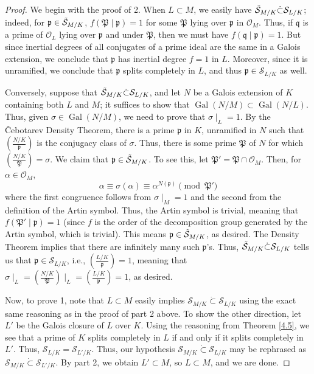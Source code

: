 \documentclass{article}
\DeclareMathOperator{\Gal}{Gal}
\theoremstyle{plain}
\theoremstyle{definition}
\theoremstyle{remark}
\numberwithin{equation}{section}
\numberwithin{thm}{section}
\begin{document}
\begin{proof}
We begin with the proof of 2. When $L \subset M$, we easily have $\Tilde{\mathcal{S}}_{M/K} \dot{\subset} \mathcal{S}_{L/K}$; indeed, for $\mathfrak{p} \in \Tilde{\mathcal{S}}_{M/K}$, $f(\mathfrak{P} \mid \mathfrak{p}) = 1$ for some $\mathfrak{P}$ lying over $\mathfrak{p}$ in $\mathcal{O}_M$. Thus, if $\mathfrak{q}$ is a prime of $\mathcal{O}_L$ lying over $\mathfrak{p}$ and under $\mathfrak{P}$, then we must have $f(\mathfrak{q} \mid \mathfrak{p}) = 1$. But since inertial degrees of all conjugates of a prime ideal are the same in a Galois extension, we conclude that $\mathfrak{p}$ has inertial degree $f = 1$ in $L$. Moreover, since it is unramified, we conclude that $\mathfrak{p}$ splits completely in $L$, and thus $\mathfrak{p} \in \mathcal{S}_{L/K}$ as well. 

Conversely, suppose that $\Tilde{\mathcal{S}}_{M/K} \dot{\subset} \mathcal{S}_{L/K}$, and let $N$ be a Galois extension of $K$ containing both $L$ and $M$; it suffices to show that $\Gal(N/M) \subset \Gal(N/L)$. Thus, given $\sigma \in \Gal(N/M)$, we need to prove that $\sigma\mid_{L} = 1$. By the Čebotarev Density Theorem, there is a prime $\mathfrak{p}$ in $K$, unramified in $N$ such that $\left(\frac{N/K}{\mathfrak{p}}\right)$ is the conjugacy class of $\sigma$. Thus, there is some prime $\mathfrak{P}$ of $N$ for which $\left(\frac{N/K}{\mathfrak{P}}\right) = \sigma$. We claim that $\mathfrak{p} \in \Tilde{\mathcal{S}}_{M/K}$. To see this, let $\mathfrak{P}' = \mathfrak{P} \cap \mathcal{O}_M$. Then, for $\alpha \in \mathcal{O}_M$, $$\alpha \equiv \sigma(\alpha) \equiv \alpha^{N(\mathfrak{p})} \pmod{\mathfrak{P}'}$$ where the first congruence follows from $\sigma\mid_{M} = 1$ and the second from the definition of the Artin symbol. Thus, the Artin symbol is trivial, meaning that $f(\mathfrak{P}' \mid \mathfrak{p}) = 1$ (since $f$ is the order of the decomposition group generated by the Artin symbol, which is trivial). This means $\mathfrak{p} \in \Tilde{\mathcal{S}}_{M/K}$, as desired. The Density Theorem implies that there are infinitely many such $\mathfrak{p}$'s. Thus, $\Tilde{\mathcal{S}}_{M/K} \dot{\subset} \mathcal{S}_{L/K}$ tells us that $\mathfrak{p} \in \mathcal{S}_{L/K}$, i.e., $\left(\frac{L/K}{\mathfrak{p}}\right) = 1$, meaning that $\sigma\mid_{L} = \left(\frac{N/K}{\mathfrak{P}}\right)\mid_{L} = \left(\frac{L/K}{\mathfrak{p}}\right) = 1$, as desired. 

Now, to prove 1, note that $L \subset M$ easily implies $\mathcal{S}_{M/K} \dot{\subset} \mathcal{S}_{L/K}$ using the exact same reasoning as in the proof of part 2 above. To show the other direction, let $L'$ be the Galois closure of $L$ over $K$. Using the reasoning from Theorem \ref{4.5}, we see that a prime of $K$ splits completely in $L$ if and only if it splits completely in $L'$. Thus, $\mathcal{S}_{L/K} = \mathcal{S}_{L'/K}$. Thus, our hypothesis $\mathcal{S}_{M/K} \dot{\subset} \mathcal{S}_{L/K}$ may be rephrased as $\mathcal{S}_{M/K} \dot{\subset} \mathcal{S}_{L'/K}$. By part 2, we obtain $L' \subset M$, so $L \subset M$, and we are done. 
\end{proof}
\end{document}
